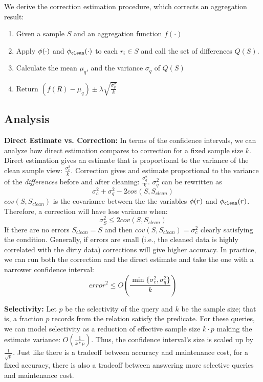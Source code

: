 We derive the correction estimation procedure, which corrects an aggregation result:
\begin{enumerate}
\item Given a sample $S$ and an aggregation function $f(\cdot)$
\item Apply $\phi (\cdot)$ and $\phi_{\texttt{clean} } (\cdot)$ to each $r_i \in S$ and call the set of differences  $Q(S)$.
\item Calculate the mean $\mu_q$, and the variance $\sigma_q$ of $Q(S)$
\item Return $(f(R) - \mu_q) \pm \lambda \sqrt{\frac{\sigma_q^2}{k}}$
\end{enumerate}

\subsection{Analysis}
\noindent \textbf{Direct Estimate vs. Correction: } In terms of the confidence intervals, we can analyze how direct estimation compares to correction for a fixed sample size $k$.
\sloppy
Direct estimation gives an estimate that is proportional to the variance of the clean sample view:  $\frac{\sigma_{c}^2}{k}$.
Correction gives and estimate proportional to the variance of the \emph{differences} before and after cleaning: $\frac{\sigma_{q}^2}{k}$.
$\sigma_{q}^2$ can be rewritten as
\[\sigma_{c}^2 + \sigma_{q}^2 - 2cov(S,S_{clean})\]
$cov(S,S_{clean})$ is the covariance between the the variables $\phi (r)$ and $\phi_{\texttt{clean} } (r)$.
Therefore, a correction will have less variance when:
\[\sigma_{S}^2 \le 2cov(S,S_{clean})\]
If there are no errors $S_{clean} = S$ and then $cov(S,S_{clean})=\sigma_c^2$ clearly satisfying the condition.
Generally, if errors are small (i.e., the cleaned data is highly correlated with the dirty data) corrections will give higher accuracy.
In practice, we can run both the correction and the direct estimate and take the one with a narrower confidence interval:
\begin{equation}
error^2 \le O(\frac{\min\{\sigma_c^2,\sigma_q^2\}}{k})
\end{equation}

\vspace{0.5em}

\noindent \textbf{Selectivity: }
Let $p$ be the selectivity of the query and $k$ be the sample size; that is, a fraction $p$ records from the relation satisfy the predicate.
For these queries, we can model selectivity as a reduction of effective sample size $k\cdot p$ making the
estimate variance: $O(\frac{1}{k*p})$.
Thus, the confidence interval's size is scaled up by $\frac{1}{\sqrt{p}}$.
Just like there is a tradeoff between accuracy and maintenance cost, for a fixed accuracy, 
there is also a tradeoff between answering more selective queries and maintenance cost.

